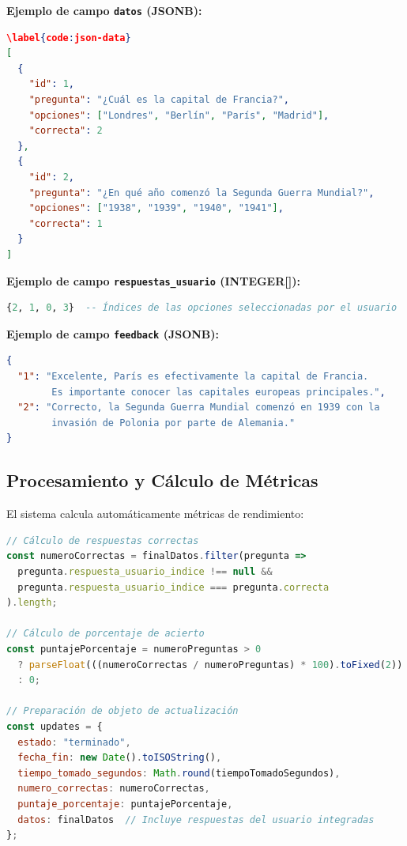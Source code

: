 \documentclass[12pt,a4paper]{report}
\begin{document}
\textbf{Ejemplo de campo \texttt{datos} (JSONB):}
\begin{lstlisting}[language=JSON, caption={Código \ref{code:json-data}: Ejemplo de estructura JSON para preguntas}]
\label{code:json-data}
[
  {
    "id": 1,
    "pregunta": "¿Cuál es la capital de Francia?",
    "opciones": ["Londres", "Berlín", "París", "Madrid"],
    "correcta": 2
  },
  {
    "id": 2,
    "pregunta": "¿En qué año comenzó la Segunda Guerra Mundial?",
    "opciones": ["1938", "1939", "1940", "1941"],
    "correcta": 1
  }
]
\end{lstlisting}

\textbf{Ejemplo de campo \texttt{respuestas\_usuario} (INTEGER[]):}
\begin{lstlisting}[language=SQL, caption=Array de respuestas del usuario]
{2, 1, 0, 3}  -- Índices de las opciones seleccionadas por el usuario
\end{lstlisting}

\textbf{Ejemplo de campo \texttt{feedback} (JSONB):}
\begin{lstlisting}[language=JSON, caption=Retroalimentación personalizada]
{
  "1": "Excelente, París es efectivamente la capital de Francia. 
        Es importante conocer las capitales europeas principales.",
  "2": "Correcto, la Segunda Guerra Mundial comenzó en 1939 con la 
        invasión de Polonia por parte de Alemania."
}
\end{lstlisting}

\subsection{Procesamiento y Cálculo de Métricas}

El sistema calcula automáticamente métricas de rendimiento:

\begin{lstlisting}[language=JavaScript, caption=Cálculo de métricas de rendimiento]
// Cálculo de respuestas correctas
const numeroCorrectas = finalDatos.filter(pregunta => 
  pregunta.respuesta_usuario_indice !== null &&
  pregunta.respuesta_usuario_indice === pregunta.correcta
).length;

// Cálculo de porcentaje de acierto
const puntajePorcentaje = numeroPreguntas > 0 
  ? parseFloat(((numeroCorrectas / numeroPreguntas) * 100).toFixed(2))
  : 0;

// Preparación de objeto de actualización
const updates = {
  estado: "terminado",
  fecha_fin: new Date().toISOString(),
  tiempo_tomado_segundos: Math.round(tiempoTomadoSegundos),
  numero_correctas: numeroCorrectas,
  puntaje_porcentaje: puntajePorcentaje,
  datos: finalDatos  // Incluye respuestas del usuario integradas
};
\end{lstlisting}
\end{document}
